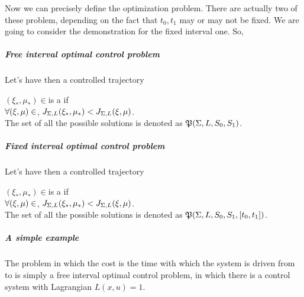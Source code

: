 Now we can precisely define the optimization problem. There are actually two of these problem, depending on the fact that $t_0,t_1$ may or may not be fixed. We are going to consider the demonstration for the fixed interval one. So,
\subparagraph{Free interval optimal control problem} Let's have  
	then a controlled trajectory {$(\xi_*,\mu_*)\in$\carcSS is a  if \\$\forall(\xi,\mu)\in$\carcSS,  $J_{\Sigma,L}(\xi_*,\mu_*)<J_{\Sigma,L}(\xi,\mu)$.\\
	The set of all the possible solutions is denoted as $\mathfrak{P}(\Sigma,L,S_0,S_1)$.
\subparagraph{Fixed interval optimal control problem} Let's have  
	then a controlled trajectory {$(\xi_*,\mu_*)\in$\carcSSfix is a  if \\$\forall(\xi,\mu)\in$\carcSSfix,  $ J_{\Sigma,L}(\xi_*,\mu_*)<J_{\Sigma,L}(\xi,\mu)$.\\
	The set of all the possible solutions is denoted as $\mathfrak{P}(\Sigma,L,S_0,S_1,[t_0,t_1])$.
\subparagraph{A simple example} The problem in which the cost is the time with which the system is driven from \sz to \so is simply a free interval optimal control problem, in which there is a control system with Lagrangian $L(x,u)=1$.

}}
